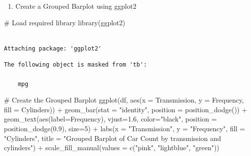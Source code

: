 \documentclass[
  letterpaper,
  DIV=11,
  numbers=noendperiod]{scrreport}
\newenvironment{Shaded}{\begin{snugshade}}{\end{snugshade}}
\newcommand{\AttributeTok}[1]{\textcolor[rgb]{0.40,0.45,0.13}{#1}}
\newcommand{\CommentTok}[1]{\textcolor[rgb]{0.37,0.37,0.37}{#1}}
\newcommand{\DecValTok}[1]{\textcolor[rgb]{0.68,0.00,0.00}{#1}}
\newcommand{\FloatTok}[1]{\textcolor[rgb]{0.68,0.00,0.00}{#1}}
\newcommand{\FunctionTok}[1]{\textcolor[rgb]{0.28,0.35,0.67}{#1}}
\newcommand{\NormalTok}[1]{\textcolor[rgb]{0.00,0.23,0.31}{#1}}
\newcommand{\SpecialCharTok}[1]{\textcolor[rgb]{0.37,0.37,0.37}{#1}}
\newcommand{\StringTok}[1]{\textcolor[rgb]{0.13,0.47,0.30}{#1}}
\providecommand{\tightlist}{%
  \setlength{\itemsep}{0pt}\setlength{\parskip}{0pt}}\usepackage{longtable,booktabs,array}
\begin{document}
\begin{enumerate}
\def\labelenumi{\arabic{enumi}.}
\setcounter{enumi}{1}
\tightlist
\item
  Create a Grouped Barplot using ggplot2
\end{enumerate}

\begin{Shaded}
\begin{Highlighting}[]
\CommentTok{\# Load required library}
\FunctionTok{library}\NormalTok{(ggplot2)}
\end{Highlighting}
\end{Shaded}

\begin{verbatim}

Attaching package: 'ggplot2'
\end{verbatim}

\begin{verbatim}
The following object is masked from 'tb':

    mpg
\end{verbatim}

\begin{Shaded}
\begin{Highlighting}[]
\CommentTok{\# Create the Grouped Barplot}
\FunctionTok{ggplot}\NormalTok{(df, }
       \FunctionTok{aes}\NormalTok{(}\AttributeTok{x =}\NormalTok{ Transmission, }\AttributeTok{y =}\NormalTok{ Frequency, }\AttributeTok{fill =}\NormalTok{ Cylinders)) }\SpecialCharTok{+} 
  \FunctionTok{geom\_bar}\NormalTok{(}\AttributeTok{stat =} \StringTok{"identity"}\NormalTok{, }
           \AttributeTok{position =} \FunctionTok{position\_dodge}\NormalTok{()) }\SpecialCharTok{+}
  \FunctionTok{geom\_text}\NormalTok{(}\FunctionTok{aes}\NormalTok{(}\AttributeTok{label=}\NormalTok{Frequency), }
            \AttributeTok{vjust=}\FloatTok{1.6}\NormalTok{, }
            \AttributeTok{color=}\StringTok{"black"}\NormalTok{, }
            \AttributeTok{position =} \FunctionTok{position\_dodge}\NormalTok{(}\FloatTok{0.9}\NormalTok{), }
            \AttributeTok{size=}\DecValTok{5}\NormalTok{) }\SpecialCharTok{+}
  \FunctionTok{labs}\NormalTok{(}\AttributeTok{x =} \StringTok{"Transmission"}\NormalTok{, }\AttributeTok{y =} \StringTok{"Frequency"}\NormalTok{, }
       \AttributeTok{fill =} \StringTok{"Cylinders"}\NormalTok{,}
       \AttributeTok{title =} \StringTok{"Grouped Barplot of Car Count by transmission and cylinders"}\NormalTok{) }\SpecialCharTok{+}
  \FunctionTok{scale\_fill\_manual}\NormalTok{(}\AttributeTok{values =} \FunctionTok{c}\NormalTok{(}\StringTok{"pink"}\NormalTok{, }\StringTok{"lightblue"}\NormalTok{, }\StringTok{"green"}\NormalTok{))}
\end{Highlighting}
\end{Shaded}
\end{document}
